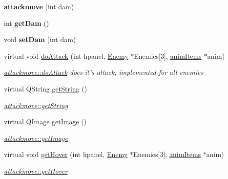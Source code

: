 \begin{DoxyCompactItemize}
\item 
\hypertarget{classattackmove_aeef16b72f9b3b146208a9db33e328b38}{{\bfseries attackmove} (int dam)}\label{classattackmove_aeef16b72f9b3b146208a9db33e328b38}

\item 
\hypertarget{classattackmove_aa971a4aef1cfb1c2ef54301e67e620a6}{int {\bfseries get\-Dam} ()}\label{classattackmove_aa971a4aef1cfb1c2ef54301e67e620a6}

\item 
\hypertarget{classattackmove_a103d4b29b142a466d564de825cf21458}{void {\bfseries set\-Dam} (int dam)}\label{classattackmove_a103d4b29b142a466d564de825cf21458}

\item 
virtual void \hyperlink{classattackmove_a80a498f0903dbe791bb1e0faacb54870}{do\-Attack} (int hpanel, \hyperlink{class_enemy}{Enemy} $\ast$Enemies\mbox{[}3\mbox{]}, \hyperlink{classanim_items}{anim\-Items} $\ast$anim)
\begin{DoxyCompactList}\small\item\em \hyperlink{classattackmove_a80a498f0903dbe791bb1e0faacb54870}{attackmove\-::do\-Attack} does it's attack, implemented for all enemies \end{DoxyCompactList}\item 
virtual Q\-String \hyperlink{classattackmove_ada49eedf4b893372c576edd48fe73161}{get\-String} ()
\begin{DoxyCompactList}\small\item\em \hyperlink{classattackmove_ada49eedf4b893372c576edd48fe73161}{attackmove\-::get\-String} \end{DoxyCompactList}\item 
virtual Q\-Image \hyperlink{classattackmove_aca59a2343b7a6c195d300dda5c8d952d}{get\-Image} ()
\begin{DoxyCompactList}\small\item\em \hyperlink{classattackmove_aca59a2343b7a6c195d300dda5c8d952d}{attackmove\-::get\-Image} \end{DoxyCompactList}\item 
virtual void \hyperlink{classattackmove_a0ff82349551bd72f4d57b3367bb318fa}{get\-Hover} (int hpanel, \hyperlink{class_enemy}{Enemy} $\ast$Enemies\mbox{[}3\mbox{]}, \hyperlink{classanim_items}{anim\-Items} $\ast$anim)
\begin{DoxyCompactList}\small\item\em \hyperlink{classattackmove_a0ff82349551bd72f4d57b3367bb318fa}{attackmove\-::get\-Hover} \end{DoxyCompactList}\end{DoxyCompactItemize}
